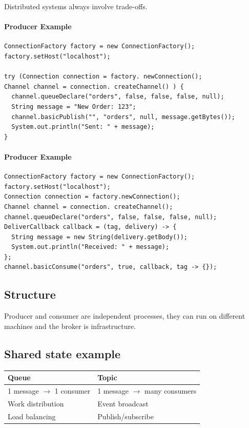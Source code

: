 Distributed systems always involve trade-offs.


\paragraph{Producer Example}
\begin{verbatim}
ConnectionFactory factory = new ConnectionFactory();
factory.setHost("localhost");

try (Connection connection = factory. newConnection();
Channel channel = connection. createChannel() ) {
  channel.queueDeclare("orders", false, false, false, null);
  String message = "New Order: 123";
  channel.basicPublish("", "orders", null, message.getBytes());
  System.out.println("Sent: " + message);
}
\end{verbatim}

\paragraph{Producer Example}
\begin{verbatim}
ConnectionFactory factory = new ConnectionFactory();
factory.setHost("localhost");
Connection connection = factory.newConnection();
Channel channel = connection. createChannel();
channel.queueDeclare("orders", false, false, false, null);
DeliverCallback callback = (tag, delivery) -> {
  String message = new String(delivery.getBody());
  System.out.println("Received: " + message);
};
channel.basicConsume("orders", true, callback, tag -> {});
\end{verbatim}


\subsection{Structure}

Producer and consumer are independent processes, they can run on diﬀerent machines and the broker is infrastructure.

\subsection{Shared state example}

\begin{table}[h!]
  \renewcommand{\arraystretch}{1.4}
  \centering
  \begin{tabular}{ll}
    \hline
    \textbf{Queue}             & \textbf{Topic}                 \\
    \hline
    1 message $\to$ 1 consumer & 1 message $\to$ many consumers \\
    Work distribution          & Event broadcast                \\
    Load balancing             & Publish/subscribe              \\
    \hline
  \end{tabular}
\end{table}


